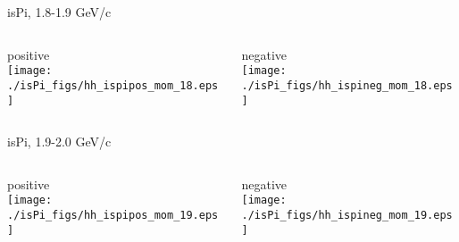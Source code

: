 \documentclass[compress]{beamer} %
\begin{document}

\begin{frame}{isPi, 1.8-1.9 GeV/c}
\begin{columns}
\begin{column}{.5\linewidth}
positive \\
\texttt{[image: ./isPi\_figs/hh\_ispipos\_mom\_18.eps]} \\
\end{column}
\begin{column}{.5\linewidth}
negative \\
\texttt{[image: ./isPi\_figs/hh\_ispineg\_mom\_18.eps]} \\
\end{column}
\end{columns}
\end{frame}


\begin{frame}{isPi, 1.9-2.0 GeV/c}
\begin{columns}
\begin{column}{.5\linewidth}
positive \\
\texttt{[image: ./isPi\_figs/hh\_ispipos\_mom\_19.eps]} \\
\end{column}
\begin{column}{.5\linewidth}
negative \\
\texttt{[image: ./isPi\_figs/hh\_ispineg\_mom\_19.eps]} \\
\end{column}
\end{columns}
\end{frame}



\end{document}
